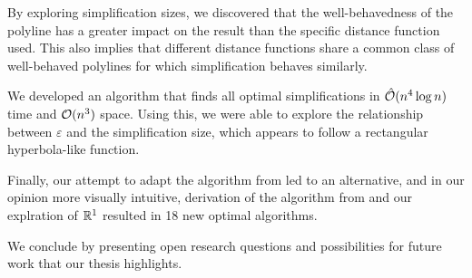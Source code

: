 By exploring simplification sizes, we discovered that the well-behavedness of the polyline has a greater impact on the result than the specific distance function used. This also implies that different distance functions share a common class of well-behaved polylines for which simplification behaves similarly.

We developed an algorithm that finds all optimal simplifications in \(\hat{\mathcal{O}}(n^4\log n)\) time and \(\mathcal{O}(n^3)\) space. Using this, we were able to explore the relationship between \(\varepsilon\) and the simplification size, which appears to follow a rectangular hyperbola-like function.

Finally, our attempt to adapt the algorithm from \citeauthor{computational_geometric_methods_for_polygonal_approximations_of_a_curve} led to an alternative, and in our opinion more visually intuitive, derivation of the algorithm from \citeauthor{global_curve_simplification} and our explration of \(\mathbb{R}^1\) resulted in 18 new optimal algorithms.

We conclude by presenting open research questions and possibilities for future work that our thesis highlights.

